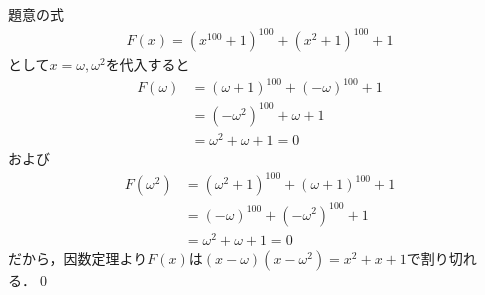 \documentclass[../../main.tex]{subfiles}
\begin{document}
題意の式
\begin{align}
  F(x)=(x^{100}+1)^{100}+(x^2+1)^{100}+1
\end{align}
として$x=\omega,\omega^2$を代入すると
\begin{align}
  F(\omega)
  &=(\omega+1)^{100}+(-\omega)^{100}+1\\
  &=(-\omega^2)^{100}+\omega+1\\
  &=\omega^2+\omega+1=0
\end{align}
および
\begin{align}
  F(\omega^2)&=(\omega^2+1)^{100}+(\omega+1)^{100}+1\\
  &=(-\omega)^{100}+(-\omega^2)^{100}+1\\
  &=\omega^2+\omega+1=0
\end{align}
だから，因数定理より$F(x)$は$(x-\omega)(x-\omega^2)=x^2+x+1$で割り切れる．\qed

\newpage
\end{document}
